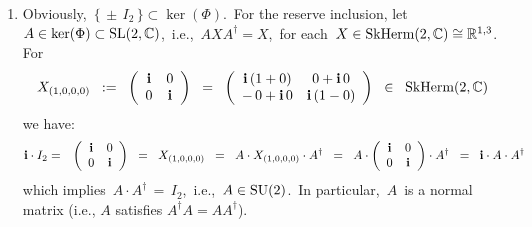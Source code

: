 \begin{enumerate}
\item
	Obviously, \,$\{\,\pm\,I_{2}\,\} \subset \ker(\Phi)$.\,
	For the reserve inclusion, let
	\,$A \in \ker(\Phi) \subset \textnormal{SL}(2,\mathbb{C})$,\,
	i.e.,
	\,$AXA^{\dagger} = X$,\, for each \,$X \in \textnormal{SkHerm}(2,\mathbb{C}) \cong \mathbb{R}^{1,3}$.\,
	For
	\begin{equation*}
	X_{(1,0,0,0)}
	\;\; := \;\;
		\left(\begin{array}{cc} \textnormal{\bf i} & 0 \\ 0 & \textnormal{\bf i} \end{array}\right)
	\;\; = \;\;
		\left(\begin{array}{cc} \textnormal{\bf i}\,(1 + 0) & 0+\textnormal{\bf i}\,0 \\ -\,0+\textnormal{\bf i}\,0 & \textnormal{\bf i}\,(1-0) \end{array}\right)
	\;\; \in \;\;
		\textnormal{SkHerm}(2,\mathbb{C})
	\end{equation*}
	we have:
	\begin{eqnarray*}
	\textnormal{\bf i} \cdot I_{2}
	& = &
		\left(\begin{array}{cc} \textnormal{\bf i} & 0 \\ 0 & \textnormal{\bf i} \end{array}\right)
	\;\; = \;\;
		X_{(1,0,0,0)}
	\;\; = \;\;
		A \cdot X_{(1,0,0,0)} \cdot A^{\dagger}
	\;\; = \;\;
		A
		\cdot
		\left(\begin{array}{cc}
			\textnormal{\bf i} & 0
			\\
			0 & \textnormal{\bf i}
			\end{array}\right)
		\cdot
		A^{\dagger}
	\;\; = \;\;
		\textnormal{\bf i} \cdot A \cdot A^{\dagger}
	\end{eqnarray*}
	which implies
	\,$A \cdot A^{\dagger} \,=\, I_{2}$,\,
	i.e.,
	\,$A \in \textnormal{SU}(2)$.\,
	In particular, \,$A$\, is a normal matrix (i.e., $A$ satisfies $A^{\dagger}A = AA^{\dagger}$).
	

\end{enumerate}
